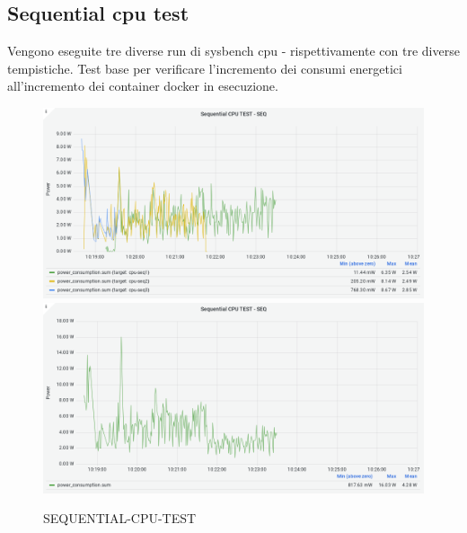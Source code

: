 \documentclass[a4paper, 11pt]{article}
\begin{document}
\subsection{Sequential cpu test}
\begin{flushleft}
Vengono eseguite tre diverse run di sysbench cpu - rispettivamente con tre diverse tempistiche. Test base per verificare l'incremento dei consumi energetici all'incremento dei container docker in esecuzione.
\end{flushleft}
\begin{figure}[h]
\caption{SEQUENTIAL-CPU-TEST}
\centering
\includegraphics[scale=0.4]{image25}
\includegraphics[scale=0.4]{image34}
\end{figure}

\clearpage
\end{document}
